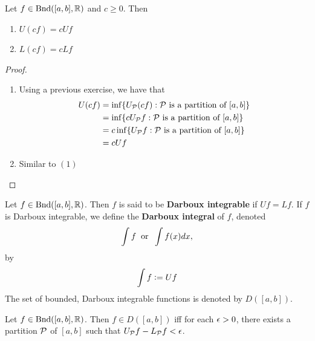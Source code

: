 \documentclass{book}
\begin{document}
	\begin{ex}  
		Let $f \in \text{Bnd}([a,b], \mathbb{R})$ and $c \geq 0$. Then 
		\begin{enumerate}
			\item $U (cf) = c U f$ 
			\item $L (cf) = c L f $
		\end{enumerate}
	\end{ex}
	
	\begin{proof}\
		\begin{enumerate}
			\item Using a previous exercise, we have that
			\begin{align*}
				U(cf) 
				&= \inf \{U_{\mathcal{P}} (cf): \mathcal{P} \text{ is a partition of } [a,b]\} \\
				&= \inf \{c U_{\mathcal{P}} f: \mathcal{P} \text{ is a partition of } [a,b]\} \\
				&= c \inf \{U_{\mathcal{P}} f: \mathcal{P} \text{ is a partition of } [a,b]\} \\
				&= c Uf
			\end{align*}
			\item Similar to $(1)$
		\end{enumerate}
	\end{proof}

	\begin{defn}  
		Let $f \in \text{Bnd}([a,b], \mathbb{R})$. Then $f$ is said to be \textbf{Darboux integrable} if $Uf = Lf$. If $f$ is Darboux integrable, we define the \textbf{Darboux integral} of $f$, denoted
		$$\int f \hspace{.2cm} \text{or} \hspace{.2cm} \int f(x) dx,$$  
		by
		$$\int f \vcentcolon= Uf$$ The set of bounded, Darboux integrable functions is denoted by $D([a,b])$.
	\end{defn}

	\begin{ex}  
		Let $f \in \text{Bnd}([a,b], \mathbb{R})$. Then $f \in D([a,b])$ iff for each $\epsilon >0$, there exists a partition $\mathcal{P}$ of $[a,b]$ such that $U_{\mathcal{P}} f - L_{\mathcal{P}} f < \epsilon$.
	\end{ex}
\end{document}
